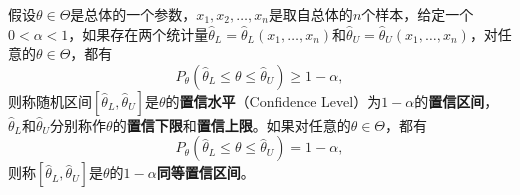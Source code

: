 \begin{definition}
假设$\theta\in \Theta$是总体的一个参数，$x_1,x_2,\ldots,x_n$是取自总体的$n$个样本，给定一个$0<\alpha<1$，如果存在两个统计量$\hat \theta_L=\hat\theta_L(x_1,\ldots,x_n)$和$\hat \theta_U=\hat\theta_U(x_1,\ldots,x_n)$，对任意的$\theta\in \Theta$，都有
\begin{equation}
    P_\theta(\hat\theta_L \le \theta \le \hat\theta_U) \ge 1-\alpha,
\end{equation}
则称随机区间$[\hat\theta_L,\hat\theta_U]$是$\theta$的\textbf{置信水平}（Confidence Level）为$1-\alpha$的\textbf{置信区间}，$\hat\theta_L$和$\hat\theta_U$分别称作$\theta$的\textbf{置信下限}和\textbf{置信上限}。如果对任意的$\theta\in \Theta$，都有
\begin{equation}
    P_\theta(\hat\theta_L \le \theta \le \hat\theta_U) = 1-\alpha,
\end{equation}
则称$[\hat\theta_L,\hat\theta_U]$是$\theta$的$1-\alpha$\textbf{同等置信区间}。
\end{definition}


